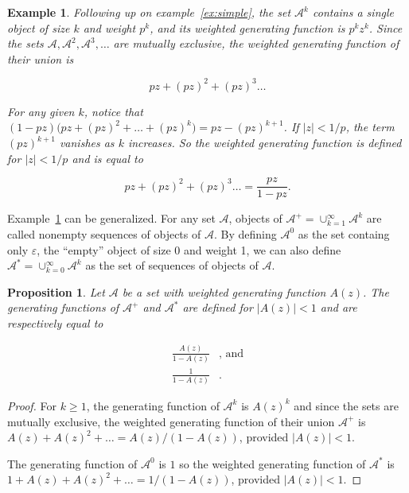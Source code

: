 \documentclass{article}
\newtheorem{example}{Example}
\newtheorem{proposition}{Proposition}
\begin{document}
\begin{example}
\label{ex:sequences}
Following up on example~\ref{ex:simple}, the set $\mathcal{A}^k$ contains
a single object of size $k$ and weight $p^k$, and its weighted generating
function is $p^kz^k$. Since the sets $\mathcal{A}, \mathcal{A}^2,
\mathcal{A}^3,\ldots$ are mutually exclusive, the weighted generating
function of their union is

\begin{equation*}
pz + (pz)^2 + (pz)^3 \ldots
\end{equation*}

For any given $k$, notice that $(1-pz) \big(pz + (pz)^2 + \ldots + (pz)^k
\big) = pz-(pz)^{k+1}$.  If $|z| < 1/p$, the term $(pz)^{k+1}$ vanishes as
$k$ increases. So the weighted generating function is defined for $|z| <
1/p$ and is equal to

\begin{equation*}
pz + (pz)^2 + (pz)^3 \ldots = \frac{pz}{1-pz}.
\end{equation*}
\end{example}

Example~\ref{ex:sequences} can be generalized. For any set $\mathcal{A}$,
objects of $\mathcal{A}^+ = \cup_{k=1}^\infty\mathcal{A}^k$ are called
nonempty sequences of objects of $\mathcal{A}$. By defining
$\mathcal{A}^0$ as the set containg only $\varepsilon$, the ``empty''
object of size 0 and weight 1, we can also define $\mathcal{A}^* =
\cup_{k=0}^\infty\mathcal{A}^k$ as the set of sequences of objects of
$\mathcal{A}$.

\begin{proposition}
\label{th:sequences}
Let $\mathcal{A}$ be a set with weighted generating function $A(z)$. The
generating functions of $\mathcal{A}^+$ and $\mathcal{A}^*$ are defined
for $|A(z)| < 1$ and are respectively equal to

\begin{equation*}
\begin{split}
\frac{A(z)}{1-A(z)}&\text{, and} \\
\frac{1}{1-A(z)}&.
\end{split}
\end{equation*}
\end{proposition}

\begin{proof}
For $k \geq 1$, the generating function of $\mathcal{A}^k$ is $A(z)^k$ and
since the sets are mutually exclusive, the weighted generating function of
their union $\mathcal{A}^+$ is $A(z) + A(z)^2 + \ldots = A(z) / (1-A(z))$,
provided $|A(z)| < 1$.

The generating function of $\mathcal{A}^0$ is $1$ so the weighted
generating function of $\mathcal{A}^*$ is $1 + A(z) + A(z)^2 + \ldots =
1 / (1-A(z))$, provided $|A(z)| < 1$.
\end{proof}
\end{document}
